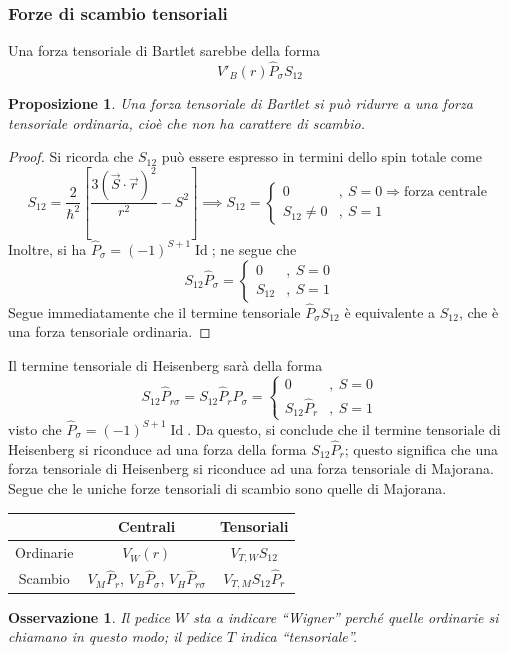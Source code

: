 \documentclass[11pt, a4paper]{scrartcl}
\theoremstyle{style}
\newtheorem{prop}{Proposizione}[section]
\newtheorem{osservazione}{Osservazione}[section]
\numberwithin{equation}{subsection}
\begin{document}
\subsubsection{Forze di scambio tensoriali}
Una forza tensoriale di Bartlet sarebbe della forma
\[
V'_B(r) \hat{P}_\sigma S_{12}
\] 
\begin{prop}

Una forza tensoriale di Bartlet si pu\`o ridurre a una forza tensoriale ordinaria, cio\`e che non ha carattere di scambio.
\end{prop}
\begin{proof}
Si ricorda che $S_{12}$ pu\`o essere espresso in termini dello spin totale come
\[
S_{12} = \frac{2}{\hbar ^2} \left[ \frac{3 (\vec{S}\cdot \vec{r})^2}{r^2} - S^2 \right] \implies  S_{12} = \begin{cases}
	0 &,\ S=0 \Rightarrow \text{forza centrale}\\
	S_{12}\neq 0 &,\ S=1
\end{cases}
\] 
Inoltre, si ha $\hat{P}_\sigma  = (-1)^{S+1} \operatorname{Id} $; ne segue che 
\[
S_{12} \hat{P}_\sigma  = \begin{cases}
	0 &,\ S=0\\
	S_{12} &,\ S=1
\end{cases}
\] 
Segue immediatamente che il termine tensoriale $\hat{P}_\sigma S_{12} $ \`e equivalente a $S_{12}$, che \`e una forza tensoriale ordinaria.
\end{proof}

\noindent Il termine tensoriale di Heisenberg sar\`a della forma 
\[
S_{12} \hat{P}_{r\sigma } = S_{12} \hat{P}_r \hat{P}_\sigma = \begin{cases}
	0 &,\ S=0\\
	S_{12} \hat{P}_r &,\ S=1
\end{cases}
\] 
visto che $\hat{P}_\sigma  = (-1)^{S+1} \operatorname{Id} $. 
Da questo, si conclude che il termine tensoriale di Heisenberg si riconduce ad una forza della forma $S_{12} \hat{P}_r$; questo significa che una forza tensoriale di Heisenberg si riconduce ad una forza tensoriale di Majorana.
Segue che le uniche forze tensoriali di scambio sono quelle di Majorana.
\begin{table}[h!]
	\centering
	\begin{tabular}{c | c | c }
		&  Centrali & Tensoriali\\
	\hline
		Ordinarie & $V_W(r)$ & $V_{T,W} S_{12}$\\
	\hline
		Scambio & $V_M \hat{P}_r$, $V_B \hat{P}_\sigma $, $V_H \hat{P}_{r\sigma }$  & $V_{T,M} S_{12} \hat{P}_r$\\
	\end{tabular}
\end{table}
\begin{osservazione}
Il pedice $W$ sta a indicare ``Wigner'' perch\'e quelle ordinarie si chiamano in questo modo; il pedice $T$ indica ``tensoriale''.
\end{osservazione}
\end{document}
